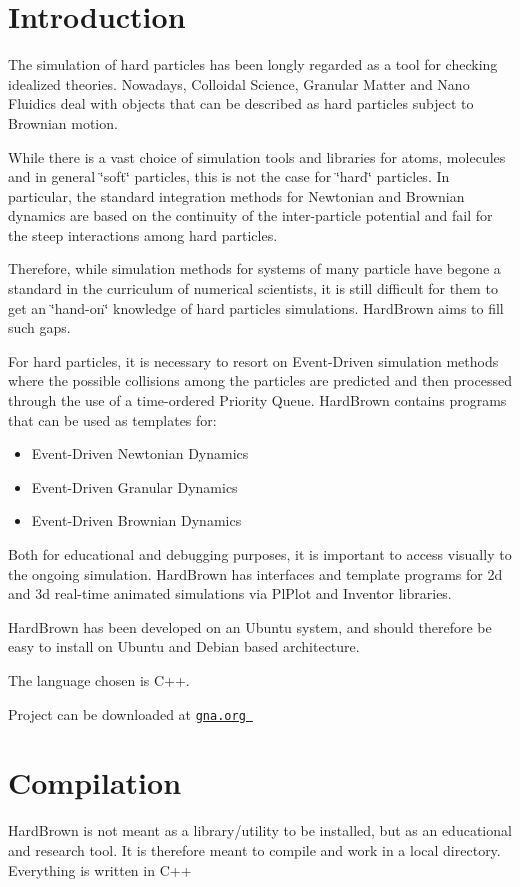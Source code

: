 \hypertarget{index_intro_sec}{}\section{Introduction}\label{index_intro_sec}
The simulation of hard particles has been longly regarded as a tool for checking idealized theories. Nowadays, Colloidal Science, Granular Matter and Nano Fluidics deal with objects that can be described as hard particles subject to Brownian motion.

While there is a vast choice of simulation tools and libraries for atoms, molecules and in general \char`\"{}soft\char`\"{} particles, this is not the case for \char`\"{}hard\char`\"{} particles. In particular, the standard integration methods for Newtonian and Brownian dynamics are based on the continuity of the inter-particle potential and fail for the steep interactions among hard particles.

Therefore, while simulation methods for systems of many particle have begone a standard in the curriculum of numerical scientists, it is still difficult for them to get an \char`\"{}hand-on\char`\"{} knowledge of hard particles simulations. HardBrown aims to fill such gaps.

For hard particles, it is necessary to resort on Event-Driven simulation methods where the possible collisions among the particles are predicted and then processed through the use of a time-ordered Priority Queue. HardBrown contains programs that can be used as templates for:

\begin{itemize}
\item Event-Driven Newtonian Dynamics\item Event-Driven Granular Dynamics\item Event-Driven Brownian Dynamics\end{itemize}


Both for educational and debugging purposes, it is important to access visually to the ongoing simulation. HardBrown has interfaces and template programs for 2d and 3d real-time animated simulations via PlPlot and Inventor libraries.

HardBrown has been developed on an Ubuntu system, and should therefore be easy to install on Ubuntu and Debian based architecture.

The language chosen is C++.

Project can be downloaded at \href{http://download.gna.org/hardshap/}{\tt gna.org }\hypertarget{index_compile_sec}{}\section{Compilation}\label{index_compile_sec}
HardBrown is not meant as a library/utility to be installed, but as an educational and research tool. It is therefore meant to compile and work in a local directory. Everything is written in C++

